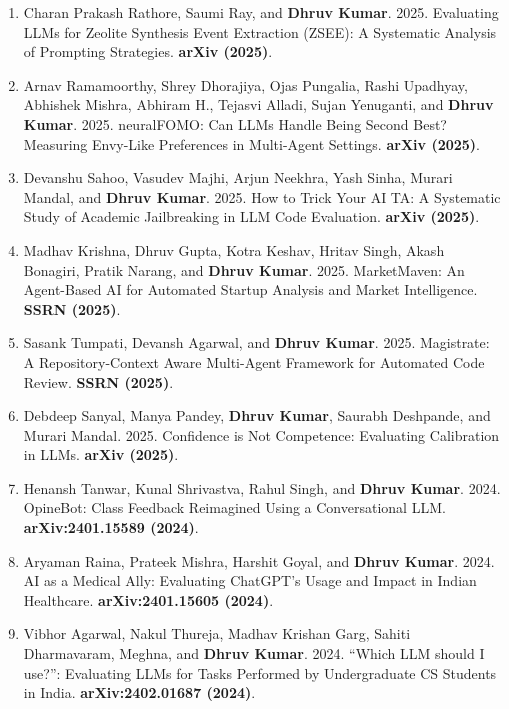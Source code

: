 \documentclass[10pt, a4paper]{article}
\begin{document}
\begin{enumerate}[label=\textbf{P\arabic*.}, leftmargin=2.8em, itemsep=0.3em]
\item Charan Prakash Rathore, Saumi Ray, and \textbf{Dhruv Kumar}. 2025. Evaluating LLMs for Zeolite Synthesis Event Extraction (ZSEE): A Systematic Analysis of Prompting Strategies. \textbf{arXiv (2025)}.

\item Arnav Ramamoorthy, Shrey Dhorajiya, Ojas Pungalia, Rashi Upadhyay, Abhishek Mishra, Abhiram H., Tejasvi Alladi, Sujan Yenuganti, and \textbf{Dhruv Kumar}. 2025. neuralFOMO: Can LLMs Handle Being Second Best? Measuring Envy-Like Preferences in Multi-Agent Settings. \textbf{arXiv (2025)}.

\item Devanshu Sahoo, Vasudev Majhi, Arjun Neekhra, Yash Sinha, Murari Mandal, and \textbf{Dhruv Kumar}. 2025. How to Trick Your AI TA: A Systematic Study of Academic Jailbreaking in LLM Code Evaluation. \textbf{arXiv (2025)}.

\item Madhav Krishna, Dhruv Gupta, Kotra Keshav, Hritav Singh, Akash Bonagiri, Pratik Narang, and \textbf{Dhruv Kumar}. 2025. MarketMaven: An Agent-Based AI for Automated Startup Analysis and Market Intelligence. \textbf{SSRN (2025)}.

\item Sasank Tumpati, Devansh Agarwal, and \textbf{Dhruv Kumar}. 2025. Magistrate: A Repository-Context Aware Multi-Agent Framework for Automated Code Review. \textbf{SSRN (2025)}.

\item Debdeep Sanyal, Manya Pandey, \textbf{Dhruv Kumar}, Saurabh Deshpande, and Murari Mandal. 2025. Confidence is Not Competence: Evaluating Calibration in LLMs. \textbf{arXiv (2025)}.

\item Henansh Tanwar, Kunal Shrivastva, Rahul Singh, and \textbf{Dhruv Kumar}. 2024. OpineBot: Class Feedback Reimagined Using a Conversational LLM. \textbf{arXiv:2401.15589 (2024)}.

\item Aryaman Raina, Prateek Mishra, Harshit Goyal, and \textbf{Dhruv Kumar}. 2024. AI as a Medical Ally: Evaluating ChatGPT's Usage and Impact in Indian Healthcare. \textbf{arXiv:2401.15605 (2024)}.

\item Vibhor Agarwal, Nakul Thureja, Madhav Krishan Garg, Sahiti Dharmavaram, Meghna, and \textbf{Dhruv Kumar}. 2024. ``Which LLM should I use?'': Evaluating LLMs for Tasks Performed by Undergraduate CS Students in India. \textbf{arXiv:2402.01687 (2024)}.


\end{enumerate}
\end{document}
